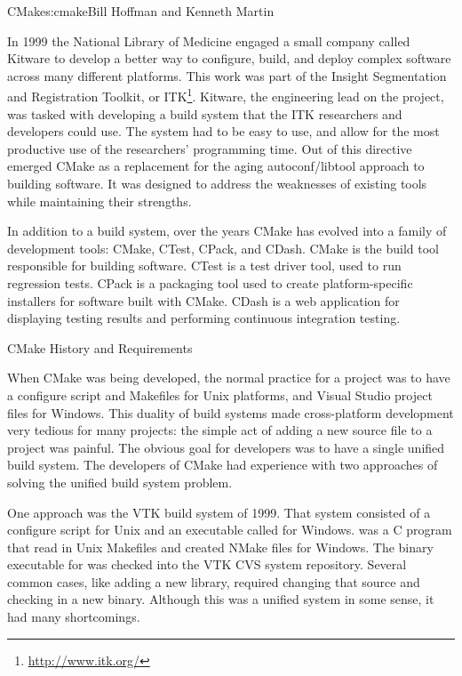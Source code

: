 \begin{aosachapter}{CMake}{s:cmake}{Bill Hoffman and Kenneth Martin}

In 1999 the National Library of Medicine engaged a small company
called Kitware to develop a better way to configure, build, and deploy
complex software across many different platforms. This work was part
of the Insight Segmentation and Registration Toolkit, or
ITK\footnote{\url{http://www.itk.org/}}.  Kitware, the engineering
lead on the project, was tasked with developing a build system that
the ITK researchers and developers could use. The system had to be
easy to use, and allow for the most productive use of the researchers'
programming time. Out of this directive emerged CMake as a replacement
for the aging autoconf/libtool approach to building software.  It was
designed to address the weaknesses of existing tools while maintaining
their strengths.

In addition to a build system, over the years CMake has evolved into a
family of development tools: CMake, CTest, CPack, and CDash. CMake is
the build tool responsible for building software. CTest is a test
driver tool, used to run regression tests. CPack is a packaging tool
used to create platform-specific installers for software built with
CMake. CDash is a web application for displaying testing results and
performing continuous integration testing.

\begin{aosasect1}{CMake History and Requirements}

When CMake was being developed, the normal practice for a project was
to have a configure script and Makefiles for Unix platforms, and
Visual Studio project files for Windows. This duality of build systems
made cross-platform development very tedious for many projects: the
simple act of adding a new source file to a project was painful. The
obvious goal for developers was to have a single unified build system.
The developers of CMake had experience with two approaches of solving
the unified build system problem.

One approach was the VTK build system of 1999.  That system consisted
of a configure script for Unix and an executable called 
for Windows.  was a C program that read in Unix
Makefiles and created NMake files for Windows.  The binary executable
for  was checked into the VTK CVS system repository.  Several
common cases, like adding a new library, required changing that source
and checking in a new binary.
Although this was a unified system in some sense, it had many
shortcomings.


\end{aosasect1}
\end{aosachapter}
